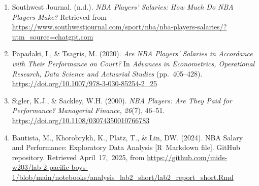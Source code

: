 \documentclass[
  11pt,
]{article}
\begin{document}
\begin{enumerate}
\def\labelenumi{\arabic{enumi}.}
\item
  Southwest Journal. (n.d.). \emph{NBA Players' Salaries: How Much Do NBA Players Make?} Retrieved from \url{https://www.southwestjournal.com/sport/nba/nba-players-salaries/?utm_source=chatgpt.com}
\item
  Papadaki, I., \& Tsagris, M. (2020). \emph{Are NBA Players' Salaries in Accordance with Their Performance on Court?} In \emph{Advances in Econometrics, Operational Research, Data Science and Actuarial Studies} (pp.~405--428). \url{https://doi.org/10.1007/978-3-030-85254-2_25}
\item
  Sigler, K.J., \& Sackley, W.H. (2000). \emph{NBA Players: Are They Paid for Performance?} \emph{Managerial Finance, 26}(7), 46--51. \url{https://doi.org/10.1108/03074350010766783}
\item
  Bautista, M., Khorobrykh, K., Platz, T., \& Lin, DW. (2024). NBA Salary and Performance: Exploratory Data Analysis {[}R~Markdown file{]}. GitHub repository. Retrieved April~17,~2025, from \url{https://github.com/mids-w203/lab-2-pacific-boys-1/blob/main/notebooks/analysis_lab2_short/lab2_report_short.Rmd}
\end{enumerate}
\end{document}
